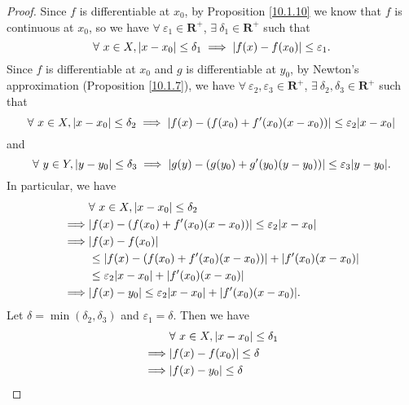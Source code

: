 \begin{proof}
    Since \(f\) is differentiable at \(x_0\), by Proposition \ref{10.1.10} we know that \(f\) is continuous at \(x_0\), so we have \(\forall\ \varepsilon_1 \in \mathbf{R}^+\), \(\exists\ \delta_1 \in \mathbf{R}^+\) such that
    \[
        \forall\ x \in X, \abs*{x - x_0} \leq \delta_1 \implies \abs*{f(x) - f(x_0)} \leq \varepsilon_1.
    \]
    Since \(f\) is differentiable at \(x_0\) and \(g\) is differentiable at \(y_0\), by Newton's approximation (Proposition \ref{10.1.7}), we have \(\forall\ \varepsilon_2, \varepsilon_3 \in \mathbf{R}^+\), \(\exists\ \delta_2, \delta_3 \in \mathbf{R}^+\) such that
    \[
        \forall\ x \in X, \abs*{x - x_0} \leq \delta_2 \implies \abs*{f(x) - (f(x_0) + f'(x_0)(x - x_0))} \leq \varepsilon_2 \abs*{x - x_0}
    \]
    and
    \[
        \forall\ y \in Y, \abs*{y - y_0} \leq \delta_3 \implies \abs*{g(y) - (g(y_0) + g'(y_0)(y - y_0))} \leq \varepsilon_3 \abs*{y - y_0}.
    \]
    In particular, we have
    \begin{align*}
                 & \forall\ x \in X, \abs*{x - x_0} \leq \delta_2                                 \\
        \implies & \abs*{f(x) - (f(x_0) + f'(x_0)(x - x_0))} \leq \varepsilon_2 \abs*{x - x_0}    \\
        \implies & \abs*{f(x) - f(x_0)}                                                           \\
                 & \leq \abs*{f(x) - (f(x_0) + f'(x_0)(x - x_0))} + \abs*{f'(x_0)(x - x_0)}       \\
                 & \leq \varepsilon_2 \abs*{x - x_0} + \abs*{f'(x_0)(x - x_0)}                    \\
        \implies & \abs*{f(x) - y_0} \leq \varepsilon_2 \abs*{x - x_0} + \abs*{f'(x_0)(x - x_0)}.
    \end{align*}
    Let \(\delta = \min(\delta_2, \delta_3)\) and \(\varepsilon_1 = \delta\).
    Then we have
    \begin{align*}
                 & \forall\ x \in X, \abs*{x - x_0} \leq \delta_1                                                                         \\
        \implies & \abs*{f(x) - f(x_0)} \leq \delta                                                                                       \\
        \implies & \abs*{f(x) - y_0} \leq \delta                                                                                          \\

\end{align*}
\end{proof}
